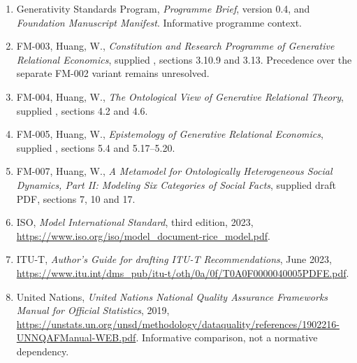 \documentclass[11pt,a4paper]{article}
\begin{document}
\GSPbibliography
\begin{enumerate}
\item Generativity Standards Program, \emph{Programme Brief}, version 0.4, and \emph{Foundation Manuscript Manifest}. Informative programme context.
\item FM-003, Huang, W., \emph{Constitution and Research Programme of Generative Relational Economics}, supplied , sections 3.10.9 and 3.13. Precedence over the separate FM-002 variant remains unresolved.
\item FM-004, Huang, W., \emph{The Ontological View of Generative Relational Theory}, supplied , sections 4.2 and 4.6.
\item FM-005, Huang, W., \emph{Epistemology of Generative Relational Economics}, supplied , sections 5.4 and 5.17--5.20.
\item FM-007, Huang, W., \emph{A Metamodel for Ontologically Heterogeneous Social Dynamics, Part II: Modeling Six Categories of Social Facts}, supplied draft PDF, sections 7, 10 and 17.
\item ISO, \emph{Model International Standard}, third edition, 2023, \url{https://www.iso.org/iso/model_document-rice_model.pdf}.
\item ITU-T, \emph{Author's Guide for drafting ITU-T Recommendations}, June 2023, \url{https://www.itu.int/dms_pub/itu-t/oth/0a/0f/T0A0F0000040005PDFE.pdf}.
\item United Nations, \emph{United Nations National Quality Assurance Frameworks Manual for Official Statistics}, 2019, \url{https://unstats.un.org/unsd/methodology/dataquality/references/1902216-UNNQAFManual-WEB.pdf}. Informative comparison, not a normative dependency.
\end{enumerate}
\end{document}
